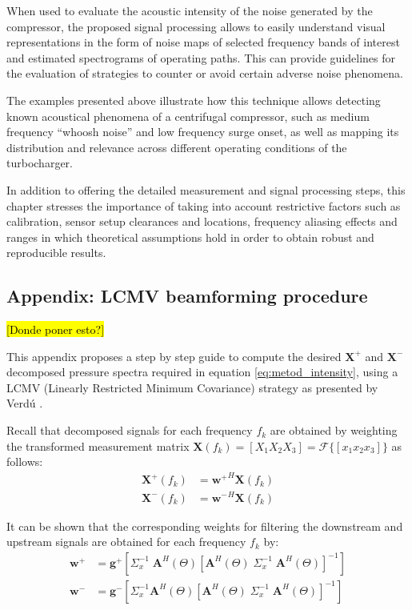 When used to evaluate the acoustic intensity of the noise generated by the compressor, the proposed signal processing allows to easily  understand visual representations in the form of noise maps of selected frequency bands of interest and estimated spectrograms of operating paths. This can provide guidelines for the evaluation of strategies to counter or avoid certain adverse noise phenomena.

The examples presented above illustrate how this technique allows detecting known acoustical phenomena of a centrifugal compressor, such as medium frequency ``whoosh noise'' and low frequency surge onset, as well as mapping its distribution and relevance across different operating conditions of the turbocharger.

In addition to offering the detailed measurement and signal processing steps, this chapter stresses the importance of taking into account restrictive factors such as calibration, sensor setup clearances and locations, frequency aliasing effects and ranges in which theoretical assumptions hold in order to obtain robust and reproducible results.

\subsection{Appendix: LCMV beamforming procedure}
\label{ann:beamformer}

\hl{[Donde poner esto?]}

This appendix proposes a step by step guide to compute the desired $\mathbf X^+$ and $\mathbf X^-$ decomposed pressure spectra required in equation \ref{eq:metod_intensity}, using a LCMV (Linearly Restricted Minimum Covariance) strategy as presented by Verdú \cite{verdu2003contribucion}.

Recall that decomposed signals for each frequency $f_k$ are obtained by weighting the transformed measurement matrix $\mathbf X(f_k)=[X_1 X_2 X_3]=\mathcal F\{[x_1 x_2 x_3]\}$ as follows:
\begin{align}
    \mathbf X^+(f_k)&=\mathbf {w^+}^H\mathbf X(f_k)\\
    \mathbf X^-(f_k)&=\mathbf {w^-}^H\mathbf X(f_k)
\end{align}

It can be shown that the corresponding weights for filtering the downstream and upstream signals are obtained for each frequency $f_k$ by:
\begin{align}
    \mathbf w^+ &=\mathbf g^+\left[ \Sigma^{-1}_x\; \mathbf A^H(\Theta)\left[\mathbf A^H(\Theta)\; \Sigma^{-1}_x\; \mathbf A^H(\Theta)\right]^{-1}\right]\\
    \mathbf w^- &=\mathbf g^-\left[ \Sigma^{-1}_x \mathbf A^H(\Theta)\left[\mathbf A^H(\Theta)\; \Sigma^{-1}_x\; \mathbf A^H(\Theta)\right]^{-1}\right]
\end{align}

